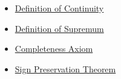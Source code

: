 \begin{dependencies}
\begin{itemize}
  \item \hyperref[def:continuity]{Definition of Continuity}
  \item \hyperref[def:supremum]{Definition of Supremum}
  \item \hyperref[ax:completeness-of-reals]{Completeness Axiom}
  \item \hyperref[thm:sign-preservation]{Sign Preservation Theorem}
\end{itemize}
\end{dependencies}

\clearpage
